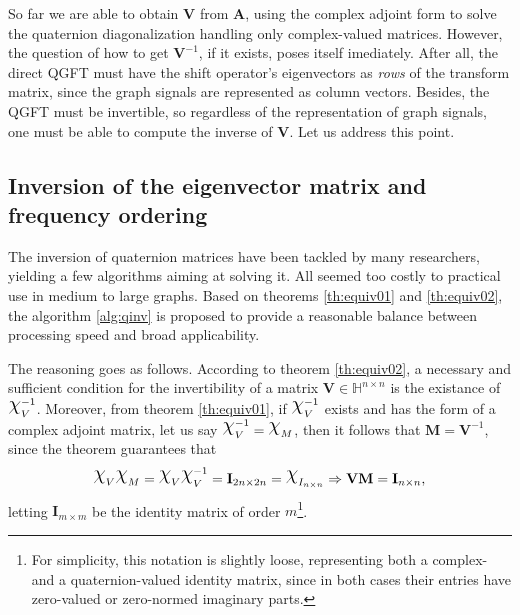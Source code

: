 So far we are able to obtain $\mathbf{V}$ from $\mathbf{A}$, using the complex adjoint form to solve the quaternion diagonalization handling only complex-valued matrices. However, the question of how to get $\mathbf{V}^{-1}$, if it exists, poses itself imediately. After all, the direct QGFT must have the shift operator's eigenvectors as \textit{rows} of the transform matrix, since the graph signals are represented as column vectors. Besides, the QGFT must be invertible, so regardless of the representation of graph signals, one must be able to compute the inverse of $\mathbf{V}$. Let us address this point.

\subsection{Inversion of the eigenvector matrix and frequency ordering}
The inversion of quaternion matrices have been tackled by many researchers, yielding a few algorithms aiming at solving it.  All seemed too costly to practical use in medium to large graphs. Based on theorems \ref{th:equiv01} and \ref{th:equiv02},
the algorithm \ref{alg:qinv} is proposed to provide a reasonable balance between processing speed and broad applicability.

The reasoning goes as follows. According to theorem \ref{th:equiv02}, a necessary and sufficient condition for the invertibility of a matrix $\mathbf{V} \in \mathbb{H}^{n \times n}$ is the existance of $\rchi^{-1}_{V}$. Moreover, from theorem \ref{th:equiv01}, if $\rchi^{-1}_{V}$ exists and has the form of a complex adjoint matrix, let us say $\rchi_{V}^{-1} = \rchi_{M}$, then it follows that $\mathbf{M} = \mathbf{V}^{-1}$, since the theorem guarantees that
\begin{equation}
\rchi_{V} \rchi_{M} = \rchi_{V} \rchi_{V}^{-1} = \mathbf{I}_{2n \times 2n} = \rchi_{I_{n \times n}}
\Rightarrow \mathbf{V} \mathbf{M} = \mathbf{I}_{n \times n},
\end{equation}
letting $\mathbf{I}_{m \times m}$ be the identity matrix of order $m$\footnote{For simplicity, this notation is slightly loose, representing both a complex- and a quaternion-valued identity matrix, since in both cases their entries have zero-valued or zero-normed imaginary parts.}.

